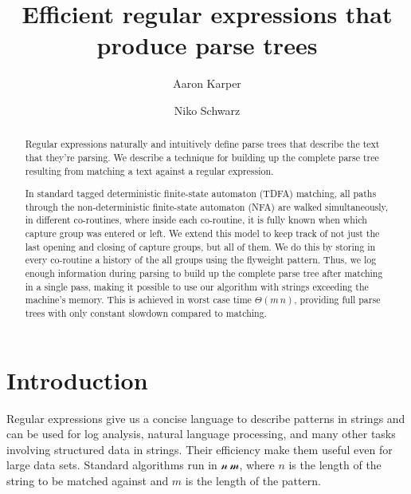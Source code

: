 \documentclass[11pt,a4paper,twoside,openright]{Thesis}
\author{Aaron Karper \and Niko Schwarz}
\theoremstyle{definition}
\begin{document}
\setlength{\pdfpageheight}{\paperheight}
\setlength{\pdfpagewidth}{\paperwidth}

\newcommand{\abs}[1]{\left|#1\right|}

\frenchspacing

\title{Efficient regular expressions that produce parse trees}

\maketitle

\begin{abstract}
Regular expressions naturally and intuitively define parse trees that describe
the text that they're parsing.  We describe a technique for building up the
complete parse tree resulting from matching a text against a regular
expression.

In standard tagged deterministic finite-state automaton (TDFA) matching, all
paths through the non-deterministic finite-state automaton (NFA) are walked
simultaneously, in different co-routines, where inside each co-routine, it is
fully known when which capture group was entered or left. We extend this model
to keep track of not just the last opening and closing of capture groups, but
all of them. We do this by storing in every co-routine a history of the all
groups using the flyweight pattern. Thus, we log enough information during
parsing to build up the complete parse tree after matching in a single pass,
making it possible to use our algorithm with strings exceeding the machine's
memory. This is achieved in  worst case time $\Theta(m\,n)$, providing full parse
trees with only constant slowdown compared to matching.
\end{abstract}

\tableofcontents

\chapter{Introduction}

Regular expressions give us a concise language to describe patterns in
strings and can be used for log analysis, natural language processing, and
many other tasks involving structured data in strings. Their efficiency make
them useful even for large data sets. Standard algorithms run in
$\mathcal{n\, m}$, where $n$ is the length of the string to be matched
against and $m$ is the length of the pattern\cite{Sedg90a}.
\end{document}
